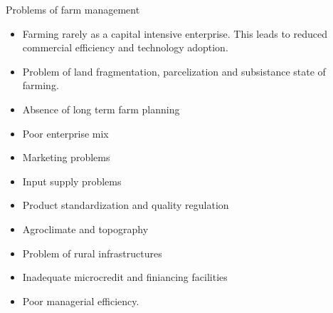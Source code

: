 \documentclass[12pt,ignorenonframetext,aspectratio=169]{beamer}
\providecommand{\tightlist}{%
  \setlength{\itemsep}{0pt}\setlength{\parskip}{0pt}}
\begin{document}
\begin{frame}{Problems of farm management}
\protect\hypertarget{problems-of-farm-management}{}

\begin{itemize}
\tightlist
\item
  Farming rarely as a capital intensive enterprise. This leads to
  reduced commercial efficiency and technology adoption.
\item
  Problem of land fragmentation, parcelization and subsistance state of
  farming.
\item
  Absence of long term farm planning
\item
  Poor enterprise mix
\item
  Marketing problems
\item
  Input supply problems
\item
  Product standardization and quality regulation
\item
  Agroclimate and topography
\item
  Problem of rural infrastructures
\item
  Inadequate microcredit and finiancing facilities
\item
  Poor managerial efficiency.
\end{itemize}

\end{frame}
\end{document}
